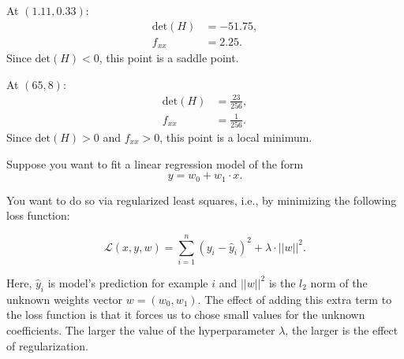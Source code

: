\documentclass{exam}
\begin{document}
\begin{questions}
\begin{solution}
At \( (1.11, 0.33) \):
\begin{align*}
    \text{det}(H) &= -51.75, \\
    f_{xx} &= 2.25.
\end{align*}
Since \(\text{det}(H) < 0\), this point is a saddle point.

At \( (65, 8) \):
\begin{align*}
    \text{det}(H) &= \frac{23}{256}, \\
    f_{xx} &= \frac{1}{256}.
\end{align*}
Since \(\text{det}(H) > 0\) and \(f_{xx} > 0\), this point is a local minimum.
\end{solution}

\question[8]
Suppose you want to fit a linear regression model of the form $$y = w_0 + w_1\cdot x.$$

You want to do so via regularized least squares, i.e., by minimizing the following loss function:

$$\mathcal{L}(x, y, w) = \sum_{i=1}^{n} \left( y_i - \hat{y}_i\right)^2 + \lambda\cdot||w||^2.$$

\vspace{0.25cm}
\noindent
Here, $\hat{y}_i$ is model's prediction for example $i$ and $||w||^2$ is the $l_2$ norm of the unknown weights vector $w = (w_0, w_1)$. The effect of adding this extra term to the loss function is that it forces us to chose small values for the unknown coefficients. The larger the value of the hyperparameter $\lambda$, the larger is the effect of regularization.

\end{questions}
\end{document}
